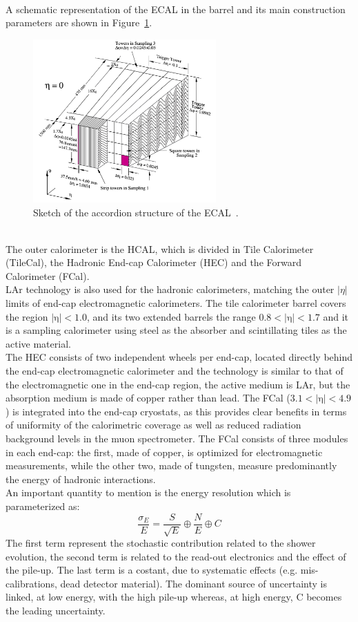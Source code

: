 \\A schematic representation of the ECAL in the barrel and its main construction parameters are shown in Figure~\ref{fig:ECAL}. 
\begin{figure}[h]
	\centering
	\includegraphics[width=7cm]{Chapters/CH2/figures/ECAL}
	\caption{Sketch of the accordion structure of the ECAL~\cite{cal}.}
	\label{fig:ECAL}
\end{figure}
\vspace{\baselineskip}
\\The outer calorimeter is the HCAL, which is divided in Tile Calorimeter (TileCal), the Hadronic End-cap Calorimeter (HEC) and the Forward Calorimeter (FCal). \\
LAr technology is also used for the hadronic calorimeters, matching the outer $|\eta|$ limits of end-cap electromagnetic calorimeters. 
The tile calorimeter barrel covers the region $\mathrm{|\eta|<1.0}$, and its two extended barrels the range $\mathrm{0.8<|\eta|<1.7}$ and it is a sampling calorimeter 
using steel as the absorber and scintillating tiles as the active material.\\
The HEC consists of two independent wheels per end-cap, located directly behind the end-cap electromagnetic calorimeter and the technology is similar to that of the 
electromagnetic one in the end-cap region, the active medium is LAr, but the absorption medium is made of copper rather than lead.
The FCal ($\mathrm{3.1<|\eta|<4.9}$) is integrated into the end-cap cryostats, as this provides clear benefits in terms of uniformity of the calorimetric coverage as well as reduced radiation background levels in 
the muon spectrometer. The FCal consists of three modules in each end-cap: the first, made of copper, is optimized for electromagnetic measurements, while the other two, made of tungsten, measure 
predominantly the energy of hadronic interactions.\\
An important quantity to mention is the energy resolution which is parameterized as:
\begin{equation}
\frac{\sigma_{E}}{E}=\frac{S}{\sqrt{E}} \oplus \frac{N}{E} \oplus C
\end{equation}
The first term represent the stochastic contribution related to the shower evolution, the second term
is related to the read-out electronics and the effect of the pile-up. The last term is a costant, due to systematic effects (e.g. mis-calibrations, dead detector material). 
The dominant source of uncertainty is linked, at low energy, with the high pile-up whereas, at high energy, C becomes the leading uncertainty. 

